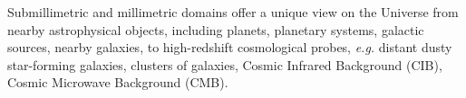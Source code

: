 

Submillimetric and millimetric domains offer a unique view on the
Universe from nearby astrophysical objects, including planets,
planetary systems, galactic sources, nearby galaxies, to high-redshift
cosmological probes, \emph{e.g.} distant dusty star-forming galaxies,
clusters of galaxies, Cosmic Infrared Background (CIB), Cosmic Microwave
Background (CMB).

